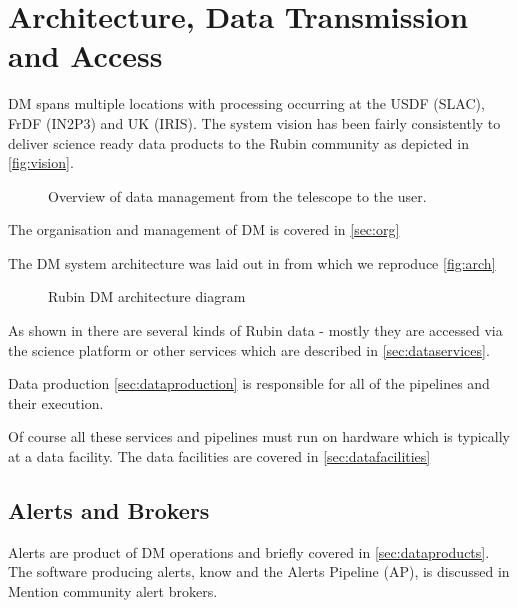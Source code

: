 \section {Architecture, Data Transmission and  Access } \label{sec:arch}
DM spans multiple locations with processing occurring at the USDF (SLAC), FrDF (IN2P3) and UK (IRIS).
The system vision has been fairly consistently to deliver science ready data products to the Rubin community as depicted in \autoref{fig:vision}.

\begin{figure*}[ht]
\caption{Overview of data management from the telescope to the user. \label{fig:vision}}
\end{figure*}

The organisation and management of DM is covered in \autoref{sec:org}

The DM system architecture was laid out in \cite{LDM-148} from which we reproduce \autoref{fig:arch}
\begin{figure}
\caption{Rubin DM architecture diagram \citet{LDM-148}\label{fig:arch}}
\end{figure}


As shown in  there are several kinds of Rubin data - mostly they are accessed via
the science platform or other services which are described in \autoref{sec:dataservices}.

Data production \autoref{sec:dataproduction} is responsible for all of the pipelines and their execution.

Of course all these services and pipelines must run on hardware which is typically at a data facility.
The data facilities are covered in \autoref{sec:datafacilities}


\subsection{Alerts and Brokers}
Alerts are  product of DM operations and  briefly covered in \autoref{sec:dataproducts}.
The software producing alerts, know and the Alerts Pipeline (AP), is discussed in 
Mention community alert brokers.
